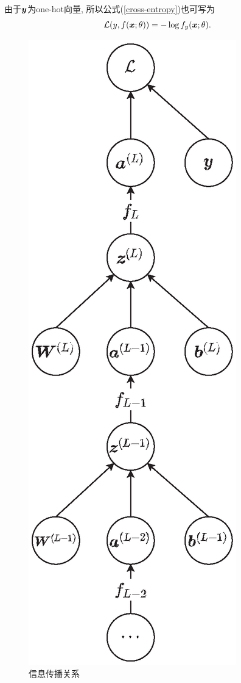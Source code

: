 \documentclass[12pt, a4paper, oneside]{ctexart}
\begin{document}
由于$\boldsymbol{y}$为one-hot向量, 所以公式(\ref{cross-entropy})也可写为
\begin{equation}
    \mathcal{L}(y, f(\boldsymbol{x};\theta)) = -\log f_y(\boldsymbol{x};\theta).
\end{equation}

{
\begin{figure}
    \centering
    \includegraphics[scale=0.7]{信息传播图.eps}
    \caption{信息传播关系}
    \label{figure-信息传播关系}
\end{figure}
}
\end{document}
